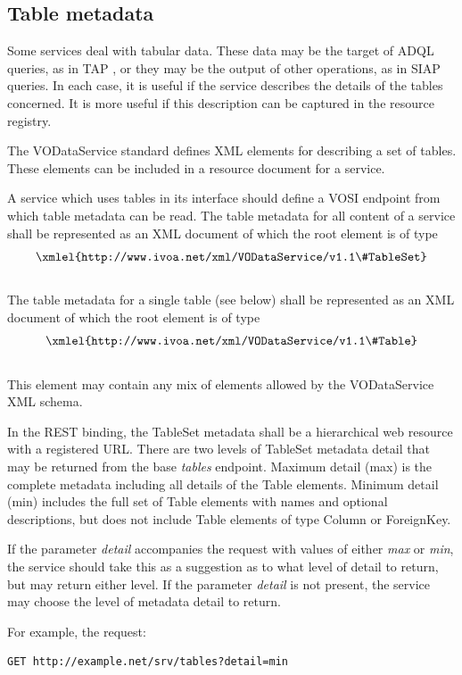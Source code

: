 \documentclass[11pt,letter]{ivoa}
\begin{document}
\subsection{Table metadata}

 Some services deal with tabular data. These data may be the target of ADQL queries, as in TAP \citep{std:TAP}, or they may be the output of other operations, as in SIAP queries. In each case, it is useful if the service describes the details of the tables concerned. It is more useful if this description can be captured in the resource registry.

The VODataService standard \citep{std:VODS11} defines XML elements for describing a set of tables. These elements can be included in a resource document for a service.

A service which uses tables in its interface should define a VOSI endpoint from which table metadata can be read. The table metadata for all content of a service shall be represented as an XML document of which the root element is of type\\
$$\hbox{\xmlel{http://www.ivoa.net/xml/VODataService/v1.1\#TableSet}}$$\\
The table metadata for a single table (see below) shall be represented as an
XML document of which the root element is of type\\
$$\hbox{\xmlel{http://www.ivoa.net/xml/VODataService/v1.1\#Table}}$$\\
This element may contain any mix of elements allowed by the VODataService XML schema.

In the REST binding, the TableSet metadata shall be a hierarchical web resource with a registered URL.  There are two levels of TableSet metadata detail that may be returned from the base \textit{tables} endpoint.  Maximum detail (max) is the complete metadata including all details of the Table elements.  Minimum detail (min) includes the full set of Table elements with names and optional descriptions, but does not include Table elements of type Column or ForeignKey.

If the parameter \textit{detail} accompanies the request with values of either \textit{max} or \textit{min}, the service should take this as a suggestion as to what level of detail to return, but may return either level.  If the parameter \textit{detail} is not present, the service may choose the level of metadata detail to return.

For example, the request:

\begin{verbatim}
GET http://example.net/srv/tables?detail=min
\end{verbatim}
\end{document}
